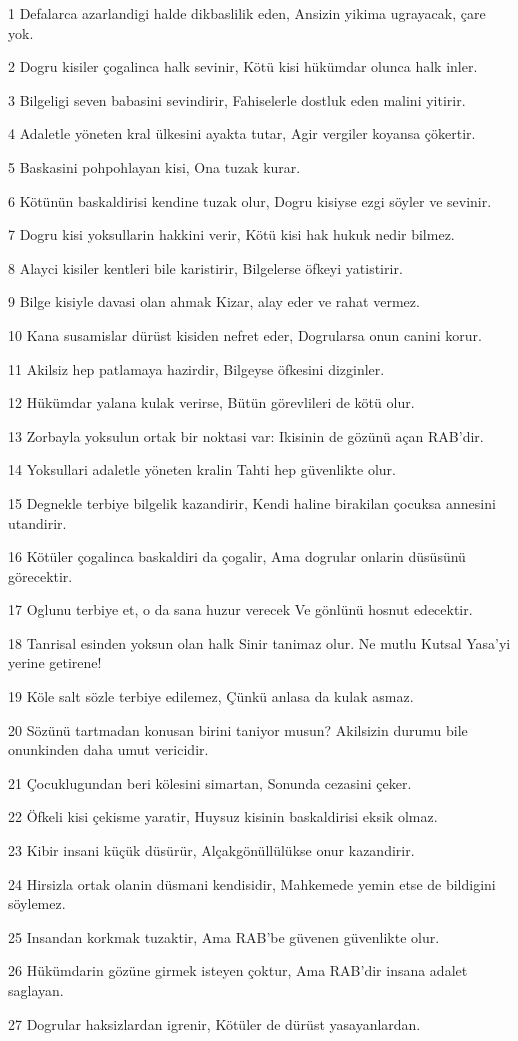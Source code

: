 \par 1 Defalarca azarlandigi halde dikbaslilik eden, Ansizin yikima ugrayacak, çare yok.
\par 2 Dogru kisiler çogalinca halk sevinir, Kötü kisi hükümdar olunca halk inler.
\par 3 Bilgeligi seven babasini sevindirir, Fahiselerle dostluk eden malini yitirir.
\par 4 Adaletle yöneten kral ülkesini ayakta tutar, Agir vergiler koyansa çökertir.
\par 5 Baskasini pohpohlayan kisi, Ona tuzak kurar.
\par 6 Kötünün baskaldirisi kendine tuzak olur, Dogru kisiyse ezgi söyler ve sevinir.
\par 7 Dogru kisi yoksullarin hakkini verir, Kötü kisi hak hukuk nedir bilmez.
\par 8 Alayci kisiler kentleri bile karistirir, Bilgelerse öfkeyi yatistirir.
\par 9 Bilge kisiyle davasi olan ahmak Kizar, alay eder ve rahat vermez.
\par 10 Kana susamislar dürüst kisiden nefret eder, Dogrularsa onun canini korur.
\par 11 Akilsiz hep patlamaya hazirdir, Bilgeyse öfkesini dizginler.
\par 12 Hükümdar yalana kulak verirse, Bütün görevlileri de kötü olur.
\par 13 Zorbayla yoksulun ortak bir noktasi var: Ikisinin de gözünü açan RAB'dir.
\par 14 Yoksullari adaletle yöneten kralin Tahti hep güvenlikte olur.
\par 15 Degnekle terbiye bilgelik kazandirir, Kendi haline birakilan çocuksa annesini utandirir.
\par 16 Kötüler çogalinca baskaldiri da çogalir, Ama dogrular onlarin düsüsünü görecektir.
\par 17 Oglunu terbiye et, o da sana huzur verecek Ve gönlünü hosnut edecektir.
\par 18 Tanrisal esinden yoksun olan halk Sinir tanimaz olur. Ne mutlu Kutsal Yasa'yi yerine getirene!
\par 19 Köle salt sözle terbiye edilemez, Çünkü anlasa da kulak asmaz.
\par 20 Sözünü tartmadan konusan birini taniyor musun? Akilsizin durumu bile onunkinden daha umut vericidir.
\par 21 Çocuklugundan beri kölesini simartan, Sonunda cezasini çeker.
\par 22 Öfkeli kisi çekisme yaratir, Huysuz kisinin baskaldirisi eksik olmaz.
\par 23 Kibir insani küçük düsürür, Alçakgönüllülükse onur kazandirir.
\par 24 Hirsizla ortak olanin düsmani kendisidir, Mahkemede yemin etse de bildigini söylemez.
\par 25 Insandan korkmak tuzaktir, Ama RAB'be güvenen güvenlikte olur.
\par 26 Hükümdarin gözüne girmek isteyen çoktur, Ama RAB'dir insana adalet saglayan.
\par 27 Dogrular haksizlardan igrenir, Kötüler de dürüst yasayanlardan.

